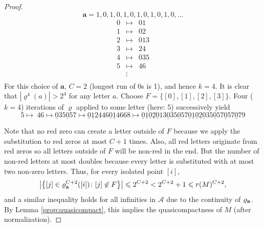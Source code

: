 \begin{proof}
\begin{table}
\[ \mathbf{a}=1,0,1,0,1,0,1,0,1,0,1,0,\ldots\]
\[ \begin{array}{cll}
0 & \mapsto & 01\\
1 & \mapsto & 02\\
2 & \mapsto & 013\\
3 & \mapsto & 24\\
4 & \mapsto & 035\\
5 & \mapsto & 46\\
 & \vdots & \\
 \end{array} \]
For this choice of $\mathbf{a}$, $C=2$ (longest run of 0s is 1), and hence $k=4$. It is clear that $| \varrho^4(a)|>2^4$ for any letter $a$.
Choose $F=\{ [0], [1], [2], [3] \}$.  Four ($k=4$) iterations of $\varrho$ applied to some letter (here: 5) successively yield
\[ 5 \mapsto\ 46 \mapsto \underline{0}35\underline{0}57 \mapsto \underline{0}\underline{1}
2446\underline{0}\underline{1}4668 \mapsto \underline{0}\underline{1}\underline{0}\underline{2}\underline{0}
13\underline{0}35\underline{0}57\underline{0}\underline{1}\underline{0}\underline{2}\underline{0}35\underline{0}57\underline{0}57\underline{0}79\]

\caption{An example of the coloring process in the proof of Theorem \ref{thm:primrecquasi}.
Red letters are underlined. After four iterations of $\varrho$ there remain only twelve unmarked letters
($12\leqslant 2^4$), thus at most twelve letters managed to escape $F$. In fact, only nine out of the twelve unmarked letters --- $5,5,7,5,7,5,7,7,9$ --- actually escaped $F$.
\label{tab:ex-red}}
\end{table}


Note that no red zero can create a letter outside of $F$ because we apply the substitution to red zeros at most $C+1$ times. Also, all red letters originate from red zeros so all letters outside of $F$ will be non-red in the end. But the number of non-red letters at most doubles because every letter is substituted with at most two non-zero letters. Thus, for every isolated point $[i]$, 
\[
\left|\left\{[j]\in\varrho^{C+2}_{\bf{a}}([i])\colon [j]\not\in F\right\} \right| \leqslant 2^{C+2}<2^{C+2}+1\leqslant r(M)^{C+2}, 
\]
and a similar inequality holds for all infinities in $\mathcal A$ due to the continuity of $\varrho_{\bf{a}}$. By Lemma \ref{prop:quasicompact}, this implies the quasicompactness of $M$ (after normalization).
%
%
%
%
%
%
%
%
%
%
%
%
%
\end{proof}
